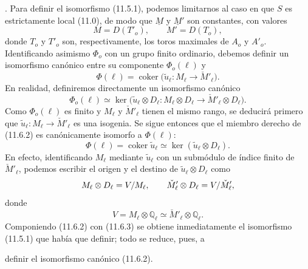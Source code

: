 \par\medskip
{}. Para definir el isomorfismo (11.5.1), podemos limitarnos al caso
en que $S$ es estrictamente local (11.0), de modo que $\underline M$ y
$\underline M'$ son constantes, con valores
\begin{equation}\tag{11.6.1}
M=D(T'_o),\qquad M'=D(T_o),
\end{equation}
donde $T_o$ y $T'_o$ son, respectivamente, los toros maximales de
$A_o$ y $A'_o$. Identificando asimismo $\Phi_o$ con un grupo finito
ordinario, debemos definir un isomorfismo canónico entre su componente
$\Phi_o(\ell)$ y
\begin{equation*}
\Phi(\ell)=\operatorname{coker}\bigl(
 \widetilde u_\ell:M_\ell\longrightarrow\check M'_\ell\bigr).
\end{equation*}
En realidad, definiremos directamente un isomorfismo canónico
\begin{equation}\tag{11.6.2}
\Phi_o(\ell)\simeq
 \ker\bigl(\widetilde u_\ell\otimes D_\ell:
 M_\ell\otimes D_\ell\longrightarrow
 \check M'_\ell\otimes D_\ell\bigr).
\end{equation}
Como $\Phi_o(\ell)$ es finito y $M_\ell$ y $\check M'_\ell$ tienen el
mismo rango, se deducirá primero que
$\widetilde u_\ell:M_\ell\to\check M'_\ell$ es una isogenia. Se sigue
entonces que el miembro derecho de (11.6.2) es canónicamente isomorfo a
$\Phi(\ell)$:
\begin{equation}\tag{11.6.3}
\Phi(\ell)=\operatorname{coker}\widetilde u_\ell
 \simeq
 \ker(\widetilde u_\ell\otimes D_\ell).
\end{equation}
En efecto, identificando $M_\ell$ mediante $\widetilde u_\ell$ con un
submódulo de índice finito de $\check M'_\ell$, podemos escribir el
origen y el destino de $\widetilde u_\ell\otimes D_\ell$ como
\begin{equation*}
\sisi{\Phi(\ell)=V/M_\ell,\qquad
\Phi'(\ell)=V/\check M'_\ell}%
{M_\ell\otimes D_\ell=V/M_\ell,\qquad
\check M'_\ell\otimes D_\ell=V/\check M'_\ell},
\end{equation*}
donde
\begin{equation*}
V=M_\ell\otimes\mathbb Q_\ell
 \simeq\check M'_\ell\otimes\mathbb Q_\ell.
\end{equation*}
Componiendo (11.6.2) con (11.6.3) se obtiene inmediatamente el
isomorfismo (11.5.1) que había que definir; todo se reduce, pues, a


definir el isomorfismo canónico (11.6.2).


